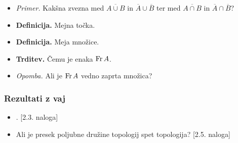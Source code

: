 \begin{enumerate}
\begin{itemize}
        \item \colorbox{yellow!30}{\emph{Primer.}} Kakšna zvezna med $\overline{A \cup B}$ in $\overline{A} \cup \overline{B}$ ter med $\overline{A \cap B}$ in $\overline{A} \cap \overline{B}$?
        \item \colorbox{purple!30}{\textbf{Definicija.}} Mejna točka.
        \item \colorbox{purple!30}{\textbf{Definicija.}} Meja množice.
        \item \colorbox{blue!30}{\textbf{Trditev.}} Čemu je enaka $\operatorname{Fr} A$.
        \item \colorbox{yellow!30}{\emph{Opomba.}} Ali je $\operatorname{Fr} A$ vedno zaprta množica?
    \end{itemize}
\end{enumerate}

\subsubsection*{Rezultati z vaj}
\begin{itemize}
    \item {}. [2.3. naloga] 
    \item Ali je presek poljubne družine topologij spet topologija? [2.5. naloga]
\end{itemize}

